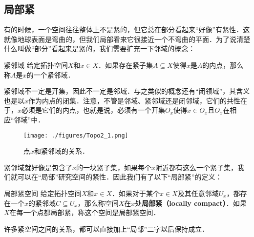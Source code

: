 \subsection{局部紧}

有的时候，一个空间往往整体上不是紧的，但它总在部分看起来“好像”有紧性．这就像地球表面是弯曲的，但我们局部看来它很接近一个不弯曲的平面．为了说清楚什么叫做“部分”看起来是紧的，我们需要扩充一下邻域的概念：

\begin{definition}{紧邻域}
给定拓扑空间$X$和$x\in X$．如果存在紧子集$A\subseteq X$使得$x$是$A$的内点，那么称$A$是$x$的一个紧邻域．
\end{definition}

紧邻域不一定是开集，因此不一定是邻域．与之类似的概念还有“闭领域”，其含义也是以$x$作为内点的闭集．注意，不管是邻域、紧邻域还是闭邻域，它们的共性在于，$x$必须是它们的内点，也就是说，必须有一个开集$O_x$使得$x\in O_x$且$O_x$在相应“邻域”中．

\begin{figure}[ht]
\centering
\texttt{[image: ./figures/Topo2\_1.png]}
\caption{点$x$和紧邻域的关系．} \label{Topo2_fig1}
\end{figure}

紧邻域就好像是包含了$x$的一块紧子集，如果每个$x$附近都有这么一个紧子集，我们就可以在“局部”研究空间的紧性．因此我们有了以下“局部紧”的定义：

\begin{definition}{局部紧空间}
给定拓扑空间$X$和$x\in X$．如果对于某个$x\in X$及其任意邻域$U_x$，都存在一个$x$的紧邻域$C\subseteq U_x$，那么称空间$X$在$x$处\textbf{局部紧（locally compact）}．如果$X$在每一个点都局部紧，称这个空间是局部紧空间．
\end{definition}

许多紧空间之间的关系，都可以直接加上“局部”二字以后保持成立．